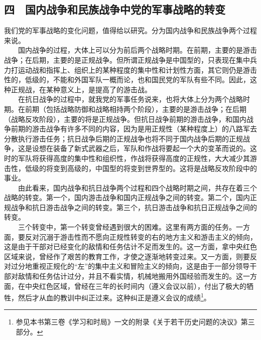 \documentclass[cn,11pt,chinese]{elegantbook}
\def\myformat#1{\hfil\hfil #1}
\begin{document}
\subsection*{\myformat{四　国内战争和民族战争中党的军事战略的转变}}
我们党的军事战略的变化问题，值得给以研究。分为国内战争和民族战争两个过程来说。\\
　　国内战争的过程，大体上可以分为前后两个战略时期。在前期，主要的是游击战争；在后期，主要的是正规战争。但所谓正规战争是中国型的，只表现在集中兵力打运动战和指挥上、组织上的某种程度的集中性和计划性方面，其它则仍是游击性的，低级的，不能和外国军队一概而论，也和国民党的军队有些不同。因此，这种正规战，在某种意义上，是提高了的游击战。\\
　　在抗日战争的过程中，就我党的军事任务说来，也将大体上分为两个战略时期。在前期（包括战略防御和战略相持两个阶段），主要的是游击战争；在后期（战略反攻阶段），主要的将是正规战争。但抗日战争前期的游击战争，和国内战争前期的游击战争有许多不同的内容，因为是用正规性（某种程度上）的八路军去分散执行游击任务；抗日战争后期的正规战争也将不同于国内战争后期的正规战争，这是设想在装备了新式武器之后，军队和作战将要起一个大的变革而说的。这时的军队将获得高度的集中性和组织性，作战将获得高度的正规性，大大减少其游击性，低级的将变到高级的，中国型的将变到世界型的。这将是战略反攻阶段中的事业。\\
　　由此看来，国内战争和抗日战争两个过程和四个战略时期之间，共存在着三个战略的转变。第一个，国内游击战争和国内正规战争之间的转变。第二个，国内正规战争和抗日游击战争之间的转变。第三个，抗日游击战争和抗日正规战争之间的转变。\\
　　三个转变中，第一个转变曾经遇到很大的困难。这里有两方面的任务。一方面，要反对沉溺于游击性而不愿向正规性转变的右的地方主义和游击主义的倾向，这是由于干部对已经变化的敌情和任务估计不足而发生的。这一方面，拿中央红色区域来说，曾经作了艰苦的教育工作，才使之逐渐地转变过来。又一方面，则要反对过分地重视正规化的“左”的集中主义和冒险主义的倾向，这是由于一部分领导干部对敌情和任务估计过分，并且不看实情，机械地搬用外国经验而发生的。这一方面，在中央红色区域，曾经在三年的长时间内（遵义会议以前），付出了极大的牺牲，然后才从血的教训中纠正过来。这种纠正是遵义会议的成绩\footnote[25]{ 参见本书第三卷《学习和时局》一文的附录《关于若干历史问题的决议》第三部分。}。\\
\end{document}
